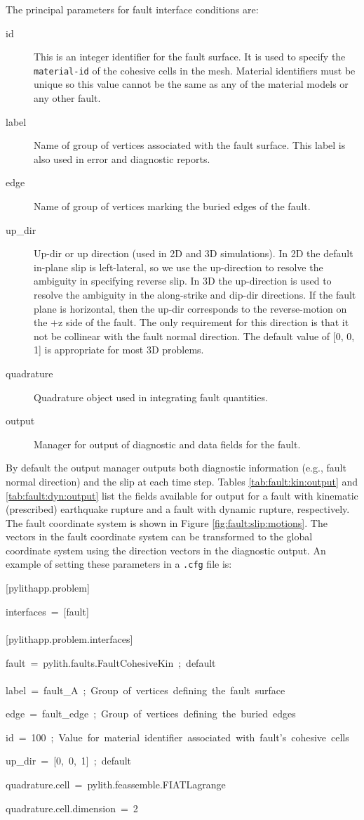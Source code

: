 The principal parameters for fault interface conditions are:
\begin{description}
\item [{id}] This is an integer identifier for the fault surface. It is
used to specify the \texttt{material-id} of the cohesive cells in
the mesh. Material identifiers must be unique so this value cannot
be the same as any of the material models or any other fault.
\item [{label}] Name of group of vertices associated with the fault surface.
This label is also used in error and diagnostic reports.
\item [{edge}] Name of group of vertices marking the buried edges of the
fault.
\item [{up\_dir}] Up-dir or up direction (used in 2D and 3D simulations).
In 2D the default in-plane slip is left-lateral, so we use the up-direction
to resolve the ambiguity in specifying reverse slip. In 3D the up-direction
is used to resolve the ambiguity in the along-strike and dip-dir directions.
If the fault plane is horizontal, then the up-dir corresponds to the
reverse-motion on the +z side of the fault. The only requirement for
this direction is that it not be collinear with the fault normal direction.
The default value of {[}0, 0, 1{]} is appropriate for most 3D problems.
\item [{quadrature}] Quadrature object used in integrating fault quantities.
\item [{output}] Manager for output of diagnostic and data fields for the
fault.
\end{description}
By default the output manager outputs both diagnostic information
(e.g., fault normal direction) and the slip at each time step. Tables
\ref{tab:fault:kin:output} and \ref{tab:fault:dyn:output} list the
fields available for output for a fault with kinematic (prescribed)
earthquake rupture and a fault with dynamic rupture, respectively.
The fault coordinate system is shown in Figure \ref{fig:fault:slip:motions}.
The vectors in the fault coordinate system can be transformed to the
global coordinate system using the direction vectors in the diagnostic
output. An example of setting these parameters in a \texttt{.cfg}
file is:
\begin{lyxcode}
{[}pylithapp.problem{]}

interfaces~=~{[}fault{]}~\\
~\\
{[}pylithapp.problem.interfaces{]}

fault~=~pylith.faults.FaultCohesiveKin~;~default~\\
~\\
label~=~fault\_A~;~Group~of~vertices~defining~the~fault~surface

edge~=~fault\_edge~;~Group~of~vertices~defining~the~buried~edges

id~=~100~;~Value~for~material~identifier~associated~with~fault's~cohesive~cells

up\_dir~=~{[}0,~0,~1{]}~;~default

quadrature.cell~=~pylith.feassemble.FIATLagrange

quadrature.cell.dimension~=~2
\end{lyxcode}

